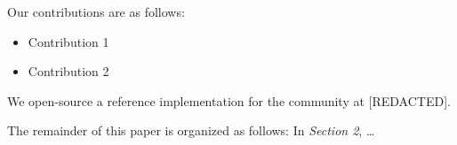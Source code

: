 Our contributions are as follows:

\begin{itemize}
  \item
    Contribution 1

  \item
    Contribution 2

\end{itemize}




We open-source a reference implementation for the community at [REDACTED].

The remainder of this paper is organized as follows: In
\textit{Section 2}, \ldots


